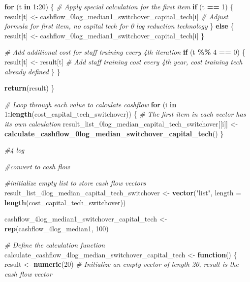 \documentclass[
]{article}
\newenvironment{Shaded}{\begin{snugshade}}{\end{snugshade}}
\newcommand{\AttributeTok}[1]{\textcolor[rgb]{0.13,0.29,0.53}{#1}}
\newcommand{\CommentTok}[1]{\textcolor[rgb]{0.56,0.35,0.01}{\textit{#1}}}
\newcommand{\ControlFlowTok}[1]{\textcolor[rgb]{0.13,0.29,0.53}{\textbf{#1}}}
\newcommand{\DecValTok}[1]{\textcolor[rgb]{0.00,0.00,0.81}{#1}}
\newcommand{\FunctionTok}[1]{\textcolor[rgb]{0.13,0.29,0.53}{\textbf{#1}}}
\newcommand{\NormalTok}[1]{#1}
\newcommand{\OtherTok}[1]{\textcolor[rgb]{0.56,0.35,0.01}{#1}}
\newcommand{\SpecialCharTok}[1]{\textcolor[rgb]{0.81,0.36,0.00}{\textbf{#1}}}
\newcommand{\StringTok}[1]{\textcolor[rgb]{0.31,0.60,0.02}{#1}}
\begin{document}
\begin{Shaded}
\begin{Highlighting}[]
  \ControlFlowTok{for}\NormalTok{ (t }\ControlFlowTok{in} \DecValTok{1}\SpecialCharTok{:}\DecValTok{20}\NormalTok{) \{}
    \CommentTok{\# Apply special calculation for the first item}
    \ControlFlowTok{if}\NormalTok{ (t }\SpecialCharTok{==} \DecValTok{1}\NormalTok{) \{}
\NormalTok{      result[t] }\OtherTok{\textless{}{-}}\NormalTok{ cashflow\_0log\_median1\_switchover\_capital\_tech[i] }\CommentTok{\# Adjust formula for first item, no capital tech for 0 log reduction technology}
\NormalTok{    \} }\ControlFlowTok{else}\NormalTok{ \{}
\NormalTok{      result[t] }\OtherTok{\textless{}{-}}\NormalTok{ cashflow\_0log\_median1\_switchover\_capital\_tech[i]}
\NormalTok{    \}}
    
    \CommentTok{\# Add additional cost for staff training every 4th iteration}
    \ControlFlowTok{if}\NormalTok{ (t }\SpecialCharTok{\%\%} \DecValTok{4} \SpecialCharTok{==} \DecValTok{0}\NormalTok{) \{}
\NormalTok{      result[t] }\OtherTok{\textless{}{-}}\NormalTok{ result[t]  }\CommentTok{\# Add staff training cost every 4th year, cost training tech already defined}
\NormalTok{    \}}
\NormalTok{  \}}
  
  \FunctionTok{return}\NormalTok{(result)}
\NormalTok{\}}

\CommentTok{\# Loop through each value to calculate cashflow}
\ControlFlowTok{for}\NormalTok{ (i }\ControlFlowTok{in} \DecValTok{1}\SpecialCharTok{:}\FunctionTok{length}\NormalTok{(cost\_capital\_tech\_switchover)) \{}
  \CommentTok{\# The first item in each vector has its own calculation}
\NormalTok{  result\_list\_0log\_median\_capital\_tech\_switchover[[i]] }\OtherTok{\textless{}{-}} \FunctionTok{calculate\_cashflow\_0log\_median\_switchover\_capital\_tech}\NormalTok{()}
\NormalTok{\}}



\CommentTok{\#4 log}

\CommentTok{\#convert to cash flow}

\CommentTok{\#initialize empty list to store cash flow vectors}
\NormalTok{result\_list\_4log\_median\_capital\_tech\_switchover }\OtherTok{\textless{}{-}} \FunctionTok{vector}\NormalTok{(}\StringTok{"list"}\NormalTok{, }\AttributeTok{length =} \FunctionTok{length}\NormalTok{(cost\_capital\_tech\_switchover))}

\NormalTok{cashflow\_4log\_median1\_switchover\_capital\_tech }\OtherTok{\textless{}{-}} \FunctionTok{rep}\NormalTok{(cashflow\_4log\_median1, }\DecValTok{100}\NormalTok{)}

\CommentTok{\# Define the calculation function}
\NormalTok{calculate\_cashflow\_4log\_median\_switchover\_capital\_tech }\OtherTok{\textless{}{-}} \ControlFlowTok{function}\NormalTok{() \{}
\NormalTok{  result }\OtherTok{\textless{}{-}} \FunctionTok{numeric}\NormalTok{(}\DecValTok{20}\NormalTok{)  }\CommentTok{\# Initialize an empty vector of length 20, result is the cash flow vector}
  

\end{Highlighting}
\end{Shaded}
\end{document}
